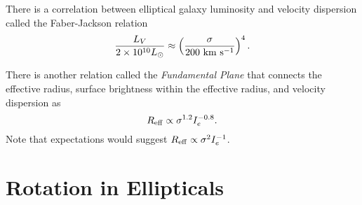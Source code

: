 \documentclass[]{article}
\begin{document}
There is a correlation between elliptical galaxy luminosity and
velocity dispersion called the Faber-Jackson relation
\begin{equation}
\frac{L_V}{2\times10^{10}L_{\odot}} \approx \left( \frac{\sigma}{200~\mathrm{km}~\mathrm{s}^{-1}}\right)^{4}.
\end{equation}

There is another relation called the {\it Fundamental Plane} that
connects the effective radius, surface brightness within the effective
radius, and velocity dispersion as
\begin{equation}
R_{\mathrm{eff}} \propto \sigma^{1.2} I_{e}^{-0.8}.
\end{equation}
Note that expectations would suggest $R_{\mathrm{eff}} \propto \sigma^2 I_{e}^{-1}$.

\section{Rotation in Ellipticals}
\end{document}
